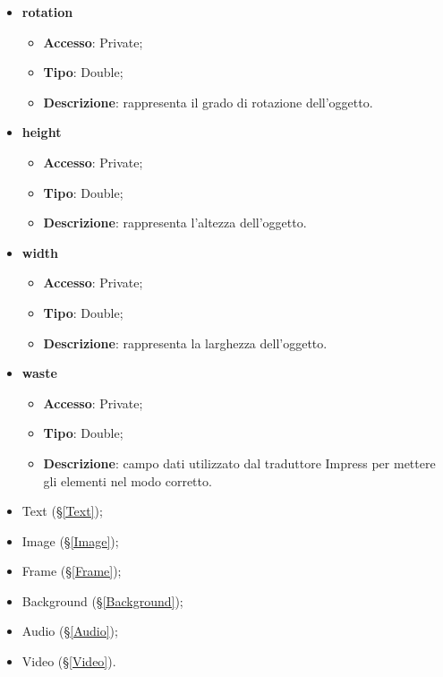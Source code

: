 {\begin{itemize}
\begin{itemize}
			\end{itemize}
			\item \textbf{rotation}
			\begin{itemize}
				\item \textbf{Accesso}: Private;
				\item \textbf{Tipo}: Double;
				\item \textbf{Descrizione}: rappresenta il grado di rotazione dell’oggetto.
			\end{itemize}
			\item \textbf{height}
			\begin{itemize}
				\item \textbf{Accesso}: Private;
				\item \textbf{Tipo}: Double;
				\item \textbf{Descrizione}: rappresenta l’altezza dell’oggetto.
			\end{itemize}
			\item \textbf{width}
			\begin{itemize}
				\item \textbf{Accesso}: Private;
				\item \textbf{Tipo}: Double;
				\item \textbf{Descrizione}: rappresenta la larghezza dell’oggetto.
			\end{itemize}
			\item \textbf{waste}
			\begin{itemize}
				\item \textbf{Accesso}: Private;
				\item \textbf{Tipo}: Double;
				\item \textbf{Descrizione}: campo dati utilizzato dal traduttore Impress per mettere gli elementi nel modo corretto.
			\end{itemize}
		\end{itemize}
		
		\begin{itemize}
			\item Text (\S\ref{Text});
			\item Image (\S\ref{Image});
			\item Frame (\S\ref{Frame});
			\item Background (\S\ref{Background});
			\item Audio (\S\ref{Audio});
			\item Video (\S\ref{Video}).
		\end{itemize}
		
}
